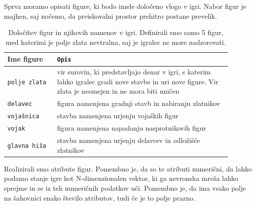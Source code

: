 \documentclass[a4paper, 12pt]{book}
\begin{document}
Sprva moramo opisati figure, ki bodo imele določeno vlogo v igri. 
Nabor figur je majhen, saj nočemo, da preiskovalni prostor prehitro postane prevelik.

\begin{table}
	\begin{center}
		\begin{tabular}{p{0.2\linewidth}|p{0.7\linewidth}}
			Ime figure        & {\tt Opis} \\ \hline
			{\tt polje zlata} & vir surovin, ki predstavljajo denar v igri, s katerim lahko igralec gradi nove stavbe in uri nove figure. 
								Vir zlata je neomejen in ne mora biti uničen \\
			{\tt delavec}     & figura namenjena gradnji stavb in nabiranju zlatnikov \\
			{\tt vojašnica}   & stavba namenjena urjenju vojaških figur \\
			{\tt vojak}       & figura namenjena napadanju nasprotnikovih figur \\
			{\tt glavna hiša} & stavba namenjena urjenju delavcev in odložišče zlatnikov \\
		\end{tabular}
	\end{center}
	\caption{Določitev figur in njihovih namenov v igri. Definirali smo samo 5 figur, med katerimi je polje zlata nevtralna, saj je igralec ne more nadzorovati. }
	\label{tableFiguresDescription}
\end{table}

Realizirali smo atribute figur. 
Pomembno je, da so te atributi numerični, da lahko podamo stanje igre kot N-dimenzionalen vektor, ki ga nevronska mreža lahko sprejme in se iz teh numeričnih podatkov uči.
Pomembno je, da ima vsako polje na šahovnici enako število atributov, tudi če je to polje prazno.
\end{document}
